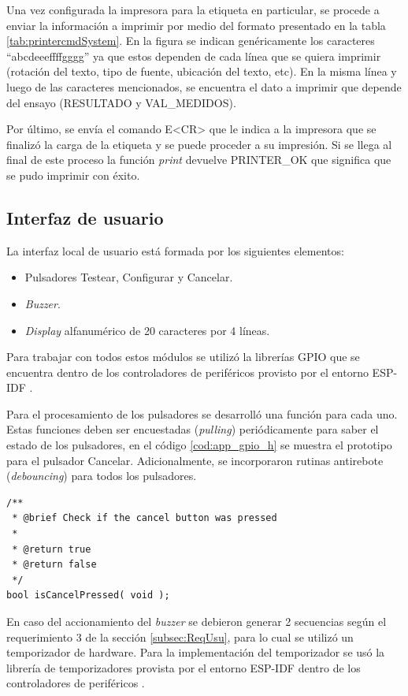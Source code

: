 Una vez configurada la impresora para la etiqueta en particular, se procede a enviar la información a imprimir por medio del formato presentado en la tabla \ref{tab:printercmdSystem}. En la figura se indican genéricamente los caracteres ``abcdeeeffffgggg'' ya que estos dependen de cada línea que se quiera imprimir (rotación del texto, tipo de fuente, ubicación del texto, etc). En la misma línea y luego de las caracteres mencionados, se encuentra el dato a imprimir que depende del ensayo (RESULTADO y VAL\_MEDIDOS).

Por último, se envía el comando E\textless{}CR\textgreater{} que le indica a la impresora que se finalizó la carga de la etiqueta y se puede proceder a su impresión. Si se llega al final de este proceso la función \textit{print} devuelve PRINTER\_OK que significa que se pudo imprimir con éxito.

\subsection{Interfaz de usuario}

La interfaz local de usuario está formada por los siguientes elementos:
\begin{itemize}
\item Pulsadores Testear, Configurar y Cancelar.
\item \textit{Buzzer}.
\item \textit{Display} alfanumérico de 20 caracteres por 4 líneas.
\end{itemize}

Para trabajar con todos estos módulos se utilizó la librerías GPIO que se encuentra dentro de los controladores de periféricos provisto por el entorno ESP-IDF \citep{ESPIDF:PER}.

Para el procesamiento de los pulsadores se desarrolló una función para cada uno. Estas funciones deben ser encuestadas (\textit{pulling}) periódicamente para saber el estado de los pulsadores, en el código \ref{cod:app_gpio_h} se muestra el prototipo para el pulsador Cancelar. Adicionalmente, se incorporaron rutinas antirebote (\textit{debouncing}) para todos los pulsadores.

\begin{lstlisting}[label=cod:app_gpio_h,caption=Pseudocódigo del módulo adc.c.]
/**
 * @brief Check if the cancel button was pressed
 * 
 * @return true 
 * @return false 
 */
bool isCancelPressed( void );
\end{lstlisting}

En caso del accionamiento del \textit{buzzer} se debieron generar 2 secuencias según el requerimiento 3 de la sección \ref{subsec:ReqUsu}, para lo cual se utilizó un temporizador de hardware. Para la implementación del temporizador se usó la librería de temporizadores provista por el entorno ESP-IDF dentro de los controladores de periféricos \citep{ESPIDF:PER}.

